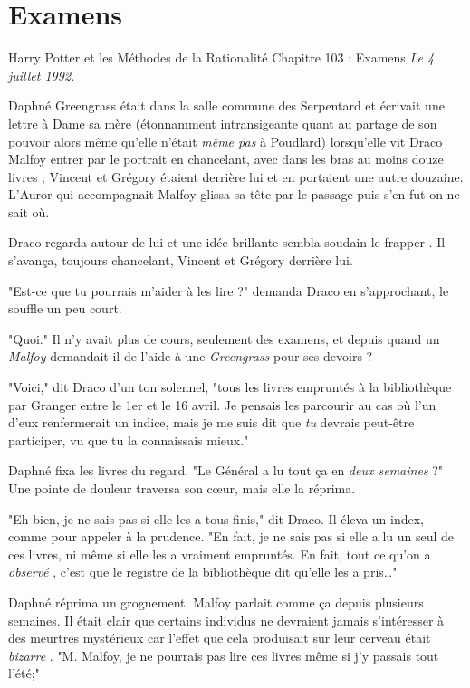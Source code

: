 
\chapter{Examens}
Harry Potter et les Méthodes de la Rationalité Chapitre 103 : Examens
\emph{Le 4 juillet 1992.} 

Daphné Greengrass était dans la salle commune des Serpentard et écrivait une lettre à Dame sa mère (étonnamment intransigeante quant au partage de son pouvoir alors même qu'elle n'était \emph{même pas}  à Poudlard) lorsqu'elle vit Draco Malfoy entrer par le portrait en chancelant, avec dans les bras au moins douze livres ; Vincent et Grégory étaient derrière lui et en portaient une autre douzaine. L'Auror qui accompagnait Malfoy glissa sa tête par le passage puis s'en fut on ne sait où.

Draco regarda autour de lui et une idée brillante sembla soudain le frapper . Il s'avança, toujours chancelant, Vincent et Grégory derrière lui.

"Est-ce que tu pourrais m'aider à les lire ?" demanda Draco en s'approchant, le souffle un peu court.

"Quoi." Il n'y avait plus de cours, seulement des examens, et depuis quand un \emph{Malfoy}  demandait-il de l'aide à une \emph{Greengrass}  pour ses devoirs ?

"Voici," dit Draco d'un ton solennel, "tous les livres empruntés à la bibliothèque par Granger entre le 1er et le 16 avril. Je pensais les parcourir au cas où l'un d'eux renfermerait un indice, mais je me suis dit que \emph{tu}  devrais peut-être participer, vu que tu la connaissais mieux."

Daphné fixa les livres du regard. "Le Général a lu tout ça en \emph{deux semaines}  ?" Une pointe de douleur traversa son cœur, mais elle la réprima.

"Eh bien, je ne sais pas si elle les a tous finis," dit Draco. Il éleva un index, comme pour appeler à la prudence. "En fait, je ne sais pas si elle a lu un seul de ces livres, ni même si elle les a vraiment empruntés. En fait, tout ce qu'on a \emph{observé} , c'est que le registre de la bibliothèque dit qu'elle les a pris…"

Daphné réprima un grognement. Malfoy parlait comme ça depuis plusieurs semaines. Il était clair que certains individus ne devraient jamais s'intéresser à des meurtres mystérieux car l'effet que cela produisait sur leur cerveau était \emph{bizarre} . "M. Malfoy, je ne pourrais pas lire ces livres même si j'y passais tout l'été;"

